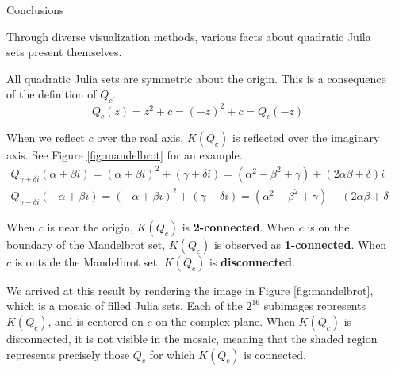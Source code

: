 \documentclass[final]{beamer}
\newlength{\sepwidth}
\newlength{\colwidth}
\newcommand{\separatorcolumn}{\begin{column}{\sepwidth}\end{column}}
\begin{document}
\begin{frame}[t]
\begin{columns}[t]
\separatorcolumn

\begin{column}{\colwidth}
	\begin{block}{Conclusions}

		Through diverse visualization methods, various facts about
		quadratic Juila sets present themselves.

		All quadratic Julia sets are symmetric about the origin.
		This is a consequence of the definition of $Q_c$. \[
			Q_c(z) = z^2 + c = (-z)^2 + c = Q_c(-z)
		\]

		When we reflect $c$ over the real axis, $K(Q_c)$
		is reflected over the imaginary axis.
		See Figure \ref{fig:mandelbrot} for an example.
		\begin{gather*}
			Q_{\gamma + \delta i}(\alpha + \beta i) = (\alpha + \beta i)^2 + (\gamma + \delta i) = (\alpha^2 - \beta^2 + \gamma) + (2\alpha \beta + \delta)i \\
			Q_{\gamma - \delta i}(-\alpha + \beta i) = (-\alpha + \beta i)^2 + (\gamma - \delta i) = (\alpha^2 - \beta^2 + \gamma) - (2\alpha \beta + \delta)i
		\end{gather*}

		When $c$ is near the origin, $K(Q_c)$
		is \textbf{2-connected}.
		When $c$ is on the boundary of the Mandelbrot set,
		$K(Q_c)$ is observed as \textbf{1-connected}.
		When $c$ is outside the Mandelbrot set,
		$K(Q_c)$ is \textbf{disconnected}.

		We arrived at this result by rendering the image in Figure \ref{fig:mandelbrot},
		which is a mosaic of filled Julia sets.
		Each of the $2^{16}$ subimages represents $K(Q_c)$,
		and is centered on $c$ on the complex plane.
		When $K(Q_c)$ is disconnected, it is not visible in the mosaic,
		meaning that the shaded region represents precisely those $Q_c$
		for which $K(Q_c)$ is connected.


\end{block}
\end{column}
\end{columns}
\end{frame}
\end{document}
